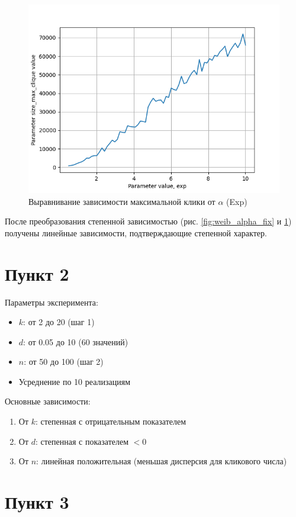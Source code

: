 \documentclass{HSEtitle}
\begin{document}
\begin{figure}[H]
    \centering
    \includegraphics[width=0.7\linewidth]{exp_alpha_fix.png}
    \caption{Выравнивание зависимости максимальной клики от $\alpha$ (Exp)}
    \label{fig:exp_alpha_fix}
\end{figure}

После преобразования степенной зависимостью (рис. \ref{fig:weib_alpha_fix} и \ref{fig:exp_alpha_fix}) получены линейные зависимости, подтверждающие степенной характер.

\section{Пункт 2}

Параметры эксперимента:
\begin{itemize}
    \item $k$: от 2 до 20 (шаг 1)
    \item $d$: от 0.05 до 10 (60 значений)
    \item $n$: от 50 до 100 (шаг 2)
    \item Усреднение по 10 реализациям
\end{itemize}

Основные зависимости:
\begin{enumerate}
    \item От $k$: степенная с отрицательным показателем
    \item От $d$: степенная с показателем $<0$
    \item От $n$: линейная положительная (меньшая дисперсия для кликового числа)
\end{enumerate}

\section{Пункт 3}
\end{document}
